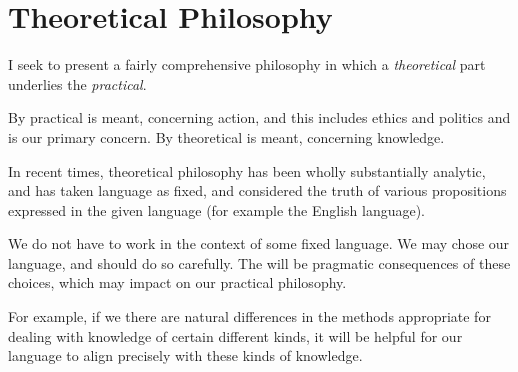 \section{Theoretical Philosophy}\label{theoretical}

I seek to present a fairly comprehensive philosophy in which a {\it theoretical} part underlies the {\it practical}.

By practical is meant, concerning action, and this includes ethics and politics and is our primary concern.
By theoretical is meant, concerning knowledge.

In recent times, theoretical philosophy has been wholly substantially analytic, and has taken language as fixed, and considered the truth of various propositions expressed in the given language (for example the English language).

We do not have to work in the context of some fixed language.
We may chose our language, and should do so carefully.
The will be pragmatic consequences of these choices, which may impact on our practical philosophy.

For example, if we there are natural differences in the methods appropriate for dealing with knowledge of certain different kinds, it will be helpful for our language to align precisely with these kinds of knowledge.
 
